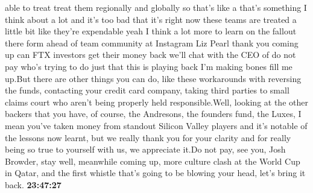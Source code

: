 \documentclass{article}%
\begin{document}
able to treat treat them regionally and globally so that's like a that's something I think about a lot and it's too bad that it's right now these teams are treated a little bit like they're expendable yeah I think a lot more to learn on the fallout there form ahead of team community at Instagram Liz Pearl thank you coming up can FTX investors get their money back we'll chat with the CEO of do not pay who's trying to do just that this is playing back  I'm making bones fill me up.But there are other things you can do, like these workarounds with reversing the funds, contacting your credit card company, taking third parties to small claims court who aren't being properly held responsible.Well, looking at the other backers that you have, of course, the Andresons, the founders fund, the Luxes, I mean you've taken money from standout Silicon Valley players and it's notable of the lessons now learnt, but we really thank you for your clarity and for really being so true to yourself with us, we appreciate it.Do not pay, see you, Josh Browder, stay well, meanwhile coming up, more culture clash at the World Cup in Qatar, and the first whistle that's going to be blowing your head, let's bring it back.%
\textbf{23:47:27}%
\newline%
\end{document}
